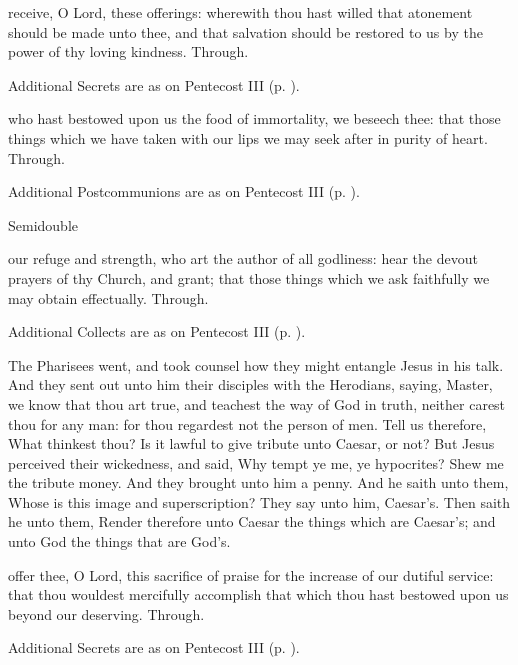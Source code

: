 \secret
{} receive, O Lord, these offerings: wherewith thou hast willed that atonement should be made unto thee, and that salvation should be restored to us by the power of thy loving kindness. Through.
\begin{rubric}
    Additional Secrets are as on Pentecost III (p. \pageref{PentecostIII}).
\end{rubric}

\postcommunion
{} who hast bestowed upon us the food of immortality, we beseech thee: that those things which we have taken with our lips we may seek after in purity of heart. Through.
\begin{rubric}
    Additional Postcommunions are as on Pentecost III (p. \pageref{PentecostIII}).
\end{rubric}

\begin{inhead}
{Semidouble}
\end{inhead}

\collect
{} our refuge and strength, who art the author of all godliness: hear the devout prayers of thy Church, and grant; that those things which we ask faithfully we may obtain effectually. Through.
\begin{rubric}
    Additional Collects are as on Pentecost III (p. \pageref{PentecostIII}).
\end{rubric}

 The Pharisees went, and took counsel how they might entangle Jesus in his talk. And they sent out unto him their disciples with the Herodians, saying, Master, we know that thou art true, and teachest the way of God in truth, neither carest thou for any man: for thou regardest not the person of men. Tell us therefore, What thinkest thou? Is it lawful to give tribute unto Caesar, or not? But Jesus perceived their wickedness, and said, Why tempt ye me, ye hypocrites? Shew me the tribute money. And they brought unto him a penny. And he saith unto them, Whose is this image and superscription? They say unto him, Caesar's. Then saith he unto them, Render therefore unto Caesar the things which are Caesar's; and unto God the things that are God's.

\secret
{} offer thee, O Lord, this sacrifice of praise for the increase of our dutiful service: that thou wouldest mercifully accomplish that which thou hast bestowed upon us beyond our deserving. Through.
\begin{rubric}
    Additional Secrets are as on Pentecost III (p. \pageref{PentecostIII}).
\end{rubric}

